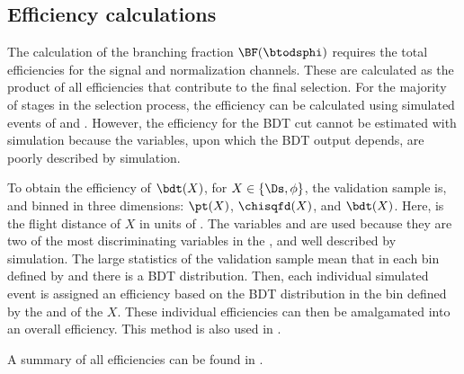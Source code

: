 \subsection{Efficiency calculations}
The calculation of the branching fraction $\BF(\btodsphi)$ requires the total efficiencies for the
signal and normalization channels.
These are calculated as the product of all efficiencies that contribute to the final selection.
For the majority of stages in the selection process, the efficiency can be calculated using
simulated events of \btodsphi and \btodsd.
However, the efficiency for the BDT cut cannot be estimated with simulation because the \pid
variables, upon which the BDT output depends, are poorly described by simulation.



To obtain the efficiency of $\bdt(X)$, for $X\in\{\Ds,\phi\}$, the validation sample is, and binned
in three dimensions: $\pt(X)$, $\chisqfd(X)$, and $\bdt(X)$.
Here, \chisqfd is the flight distance of $X$ in units of \chisq.
The variables \pt and \chisqfd are used because they are two of the most discriminating variables
in the \bdt, and well described by simulation.
The large statistics of the validation sample mean that in each bin defined by \pt and \chisqfd
there is a BDT distribution.
Then, each individual simulated event is assigned an efficiency based on the BDT distribution in
the bin defined by the \pt and \chisqfd of the $X$.
These individual efficiencies can then be amalgamated into an overall efficiency.
This method is also used in .

A summary of all efficiencies can be found in .


